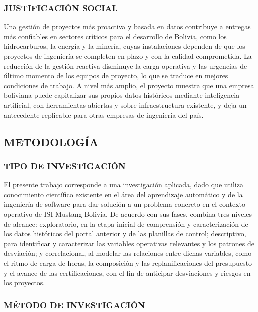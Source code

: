 \subsubsection{JUSTIFICACIÓN SOCIAL}

Una gestión de proyectos más proactiva y basada en datos contribuye a entregas más confiables en sectores críticos para el desarrollo de Bolivia, como los hidrocarburos, la energía y la minería, cuyas instalaciones dependen de que los proyectos de ingeniería se completen en plazo y con la calidad comprometida. La reducción de la gestión reactiva disminuye la carga operativa y las urgencias de último momento de los equipos de proyecto, lo que se traduce en mejores condiciones de trabajo. A nivel más amplio, el proyecto muestra que una empresa boliviana puede capitalizar sus propios datos históricos mediante inteligencia artificial, con herramientas abiertas y sobre infraestructura existente, y deja un antecedente replicable para otras empresas de ingeniería del país.

\subsection{METODOLOGÍA}

\subsubsection{TIPO DE INVESTIGACIÓN}

El presente trabajo corresponde a una investigación aplicada, dado que utiliza conocimiento científico existente en el área del aprendizaje automático y de la ingeniería de software para dar solución a un problema concreto en el contexto operativo de ISI Mustang Bolivia. De acuerdo con sus fases, combina tres niveles de alcance: exploratorio, en la etapa inicial de comprensión y caracterización de los datos históricos del portal anterior y de las planillas de control; descriptivo, para identificar y caracterizar las variables operativas relevantes y los patrones de desviación; y correlacional, al modelar las relaciones entre dichas variables, como el ritmo de carga de horas, la composición y las replanificaciones del presupuesto y el avance de las certificaciones, con el fin de anticipar desviaciones y riesgos en los proyectos.

\subsubsection{MÉTODO DE INVESTIGACIÓN}

